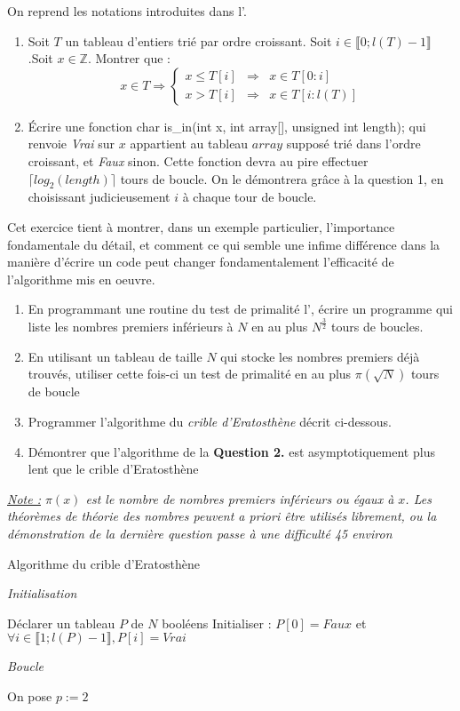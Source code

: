 \documentclass[../../../main.tex]{subfiles}
\begin{document}
\newpage
{} On reprend les notations introduites dans l'.
\begin{enumerate}
	\item Soit $T$ un tableau d'entiers trié par ordre croissant. Soit $i\in \llbracket 0; l(T)-1\rrbracket$.Soit $x\in\mathbb{Z}$. Montrer que :
	$$x\in T\Rightarrow \left\{\begin{array}{lcl}
	x\leq T[i] & \Rightarrow & x\in T[0:i] \\
	x> T[i] & \Rightarrow & x\in T[i:l(T)]\end{array}\right.$$
	\item Écrire une fonction \textsf{char is\_in(int x, int array[], unsigned int length);} qui renvoie \textit{Vrai} sur $x$ appartient au tableau $array$ supposé trié dans l'ordre croissant, et \textit{Faux} sinon. Cette fonction devra au pire effectuer $\lceil log_2(length)\rceil$ tours de boucle. On le démontrera grâce à la question 1, en choisissant judicieusement $i$ à chaque tour de boucle.
\end{enumerate}
 Cet exercice tient à montrer, dans un exemple particulier, l'importance fondamentale du détail, et comment ce qui semble une infime différence dans la manière d'écrire un code peut changer fondamentalement l'efficacité de l'algorithme mis en oeuvre.
\begin{enumerate}
	\item En programmant une routine du test de primalité l', écrire un programme qui liste les nombres premiers inférieurs à $N$ en au plus $N^{\frac{3}{2}}$ tours de boucles.
	\item En utilisant un tableau de taille $N$ qui stocke les nombres premiers déjà trouvés, utiliser cette fois-ci un test de primalité en au plus $\pi(\sqrt{N})$ tours de boucle
	\item Programmer l'algorithme du \textit{crible d'Eratosthène} décrit ci-dessous.
	\item Démontrer que l'algorithme de la \textbf{Question 2.} est asymptotiquement plus lent que le crible d'Eratosthène
\end{enumerate}
\textit{\underline{Note :} $\pi(x)$ est le nombre de nombres premiers inférieurs ou égaux à $x$. Les théorèmes de théorie des nombres peuvent a priori être utilisés librement, ou la démonstration de la dernière question passe à une difficulté 45 environ}
\begin{algorithm}
\caption{Algorithme du crible d'Eratosthène}
\;
\;

\textit{Initialisation}

Déclarer un tableau $P$ de $N$ booléens\;
Initialiser : $P[0] = Faux$ et $\forall i\in\llbracket 1; l(P)-1\rrbracket, P[i] = Vrai$\;

\textit{Boucle}

On pose $p := 2$\;
 {
}

\end{algorithm}
\end{document}
